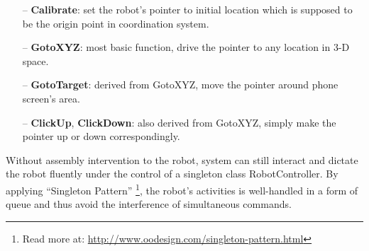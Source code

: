 	\begin{itemize}
		\item[--] \textbf{Calibrate}: set the robot's pointer to initial location which is supposed to be the origin point in coordination system.
		\item[--] \textbf{GotoXYZ}: most basic function, drive the pointer to any location in 3-D space.
		\item[--] \textbf{GotoTarget}: derived from GotoXYZ, move the pointer around phone screen's area.
		\item[--] \textbf{ClickUp}, \textbf{ClickDown}: also derived from GotoXYZ, simply make the pointer up or down correspondingly.
	\end{itemize}

Without assembly intervention to the robot, system can still interact and dictate the robot fluently under the control of a singleton class RobotController. By applying ``Singleton Pattern'' \footnote{Read more at: \url{http://www.oodesign.com/singleton-pattern.html}}, the robot's activities is well-handled in a form of queue and thus avoid the interference of simultaneous commands.